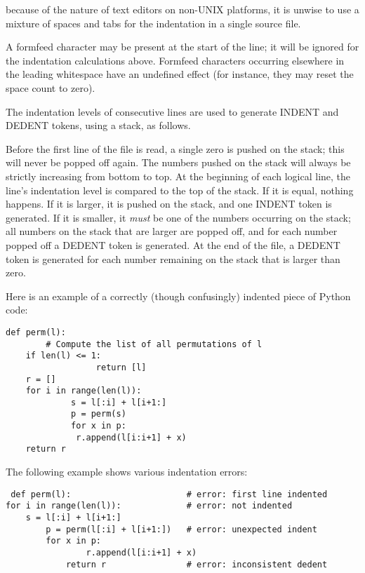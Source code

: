  because of the nature of
text editors on non-UNIX platforms, it is unwise to use a mixture of
spaces and tabs for the indentation in a single source file.

A formfeed character may be present at the start of the line; it will
be ignored for the indentation calculations above.  Formfeed
characters occurring elsewhere in the leading whitespace have an
undefined effect (for instance, they may reset the space count to
zero).

The indentation levels of consecutive lines are used to generate
INDENT and DEDENT tokens, using a stack, as follows.

Before the first line of the file is read, a single zero is pushed on
the stack; this will never be popped off again.  The numbers pushed on
the stack will always be strictly increasing from bottom to top.  At
the beginning of each logical line, the line's indentation level is
compared to the top of the stack.  If it is equal, nothing happens.
If it is larger, it is pushed on the stack, and one INDENT token is
generated.  If it is smaller, it \emph{must} be one of the numbers
occurring on the stack; all numbers on the stack that are larger are
popped off, and for each number popped off a DEDENT token is
generated.  At the end of the file, a DEDENT token is generated for
each number remaining on the stack that is larger than zero.

Here is an example of a correctly (though confusingly) indented piece
of Python code:

\begin{verbatim}
def perm(l):
        # Compute the list of all permutations of l
    if len(l) <= 1:
                  return [l]
    r = []
    for i in range(len(l)):
             s = l[:i] + l[i+1:]
             p = perm(s)
             for x in p:
              r.append(l[i:i+1] + x)
    return r
\end{verbatim}

The following example shows various indentation errors:

\begin{verbatim}
 def perm(l):                       # error: first line indented
for i in range(len(l)):             # error: not indented
    s = l[:i] + l[i+1:]
        p = perm(l[:i] + l[i+1:])   # error: unexpected indent
        for x in p:
                r.append(l[i:i+1] + x)
            return r                # error: inconsistent dedent
\end{verbatim}


